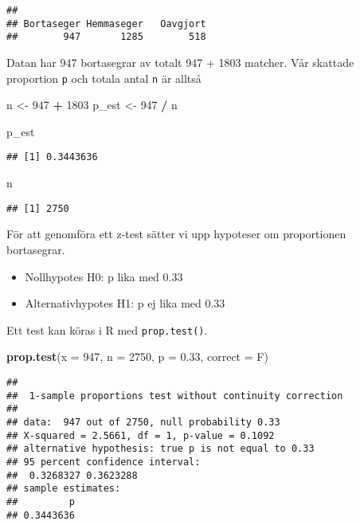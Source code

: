 \documentclass[
]{book}
\newenvironment{Shaded}{\begin{snugshade}}{\end{snugshade}}
\newcommand{\AttributeTok}[1]{\textcolor[rgb]{0.13,0.29,0.53}{#1}}
\newcommand{\DecValTok}[1]{\textcolor[rgb]{0.00,0.00,0.81}{#1}}
\newcommand{\FloatTok}[1]{\textcolor[rgb]{0.00,0.00,0.81}{#1}}
\newcommand{\FunctionTok}[1]{\textcolor[rgb]{0.13,0.29,0.53}{\textbf{#1}}}
\newcommand{\NormalTok}[1]{#1}
\newcommand{\OtherTok}[1]{\textcolor[rgb]{0.56,0.35,0.01}{#1}}
\newcommand{\SpecialCharTok}[1]{\textcolor[rgb]{0.81,0.36,0.00}{\textbf{#1}}}
\providecommand{\tightlist}{%
  \setlength{\itemsep}{0pt}\setlength{\parskip}{0pt}}
\theoremstyle{definition}
\theoremstyle{definition}
\theoremstyle{definition}
\theoremstyle{definition}
\theoremstyle{remark}
\begin{document}
\begin{verbatim}
## 
## Bortaseger Hemmaseger   Oavgjort 
##        947       1285        518
\end{verbatim}

Datan har 947 bortasegrar av totalt 947 + 1803 matcher. Vår skattade proportion \texttt{p} och totala antal \texttt{n} är alltså

\begin{Shaded}
\begin{Highlighting}[]
\NormalTok{n }\OtherTok{\textless{}{-}} \DecValTok{947} \SpecialCharTok{+} \DecValTok{1803}
\NormalTok{p\_est }\OtherTok{\textless{}{-}} \DecValTok{947} \SpecialCharTok{/}\NormalTok{ n}

\NormalTok{p\_est}
\end{Highlighting}
\end{Shaded}

\begin{verbatim}
## [1] 0.3443636
\end{verbatim}

\begin{Shaded}
\begin{Highlighting}[]
\NormalTok{n}
\end{Highlighting}
\end{Shaded}

\begin{verbatim}
## [1] 2750
\end{verbatim}

För att genomföra ett z-test sätter vi upp hypoteser om proportionen bortasegrar.

\begin{itemize}
\tightlist
\item
  Nollhypotes H0: p lika med 0.33
\item
  Alternativhypotes H1: p ej lika med 0.33
\end{itemize}

Ett test kan köras i R med \texttt{prop.test()}.

\begin{Shaded}
\begin{Highlighting}[]
\FunctionTok{prop.test}\NormalTok{(}\AttributeTok{x =} \DecValTok{947}\NormalTok{, }\AttributeTok{n =} \DecValTok{2750}\NormalTok{, }\AttributeTok{p =} \FloatTok{0.33}\NormalTok{, }\AttributeTok{correct =}\NormalTok{ F)}
\end{Highlighting}
\end{Shaded}

\begin{verbatim}
## 
##  1-sample proportions test without continuity correction
## 
## data:  947 out of 2750, null probability 0.33
## X-squared = 2.5661, df = 1, p-value = 0.1092
## alternative hypothesis: true p is not equal to 0.33
## 95 percent confidence interval:
##  0.3268327 0.3623288
## sample estimates:
##         p 
## 0.3443636
\end{verbatim}
\end{document}
